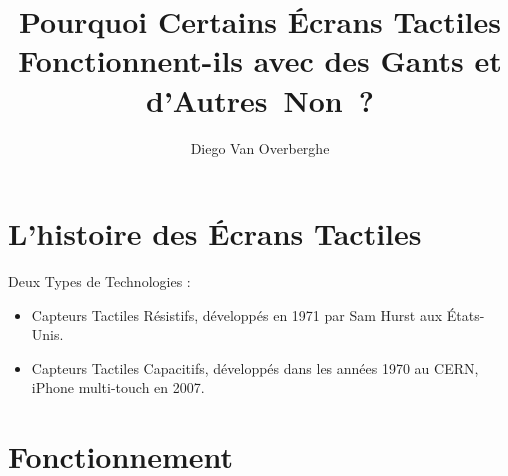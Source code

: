 \documentclass[DIV=12]{scrartcl}
\title{Pourquoi Certains Écrans Tactiles Fonctionnent-ils avec des Gants et d'Autres~Non~?}
\author{Diego Van Overberghe}
\begin{document}
    \maketitle
   \section{L'histoire des Écrans Tactiles}
   Deux Types de Technologies :
   \begin{itemize}
       \item Capteurs Tactiles Résistifs, développés en 1971  par Sam Hurst aux États-Unis.
       \item Capteurs Tactiles Capacitifs, développés dans les années 1970 au CERN, iPhone multi-touch en 2007.
   \end{itemize}
   \section{Fonctionnement}
\end{document}
